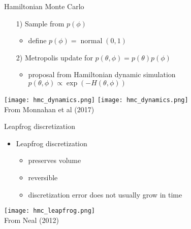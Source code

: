\documentclass[finnish,english,t]{beamer}
\DeclareMathOperator{\normal}{normal}
\begin{document}
\begin{frame}{Hamiltonian Monte Carlo}

  \begin{itemize}
  \item[1)] Sample from $p(\phi)$
    \begin{itemize}
    \item define $p(\phi) = \normal(0,1)$
    \end{itemize}
  \item[2)] Metropolis update for $p(\theta,\phi)=p(\theta)p(\phi)$
    \begin{itemize}
    \item proposal from Hamiltonian dynamic simulation $p(\theta,\phi) \propto \exp(-H(\theta,\phi))$
    \end{itemize}
  
  \end{itemize}
  \vspace{16.5pt}
  \texttt{[image: hmc\_dynamics.png]}
  \texttt{[image: hmc\_dynamics.png]}\\
  {\footnotesize From Monnahan et al (2017)}
  
\end{frame}

\begin{frame}{Leapfrog discretization}

  \begin{itemize}
  \item Leapfrog discretization
    \begin{itemize}
    \item preserves volume
    \item reversible
    \item discretization error does not usually grow in time
    \end{itemize}
  \end{itemize}
  \vspace{4.3pt}
  {\texttt{[image: hmc\_leapfrog.png]}}
  \\
  {\footnotesize From Neal (2012)}
  
\end{frame}
\end{document}
